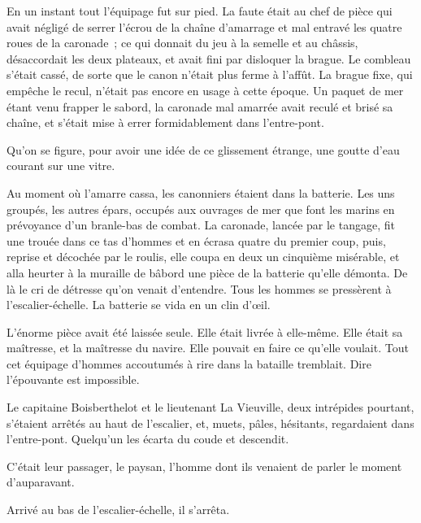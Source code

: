 \documentclass[french,twoside]{book} %
\begin{document}
En un instant tout l’équipage fut sur pied. La faute était au chef de pièce qui avait négligé de serrer l’écrou de la chaîne d’amarrage et mal entravé les quatre roues de la caronade ; ce qui donnait du jeu à la semelle et au châssis, désaccordait les deux plateaux, et avait fini par disloquer la brague. Le combleau s’était cassé, de sorte que le canon n’était plus ferme à l’affût. La brague fixe, qui empêche le recul, n’était pas encore en usage à cette époque. Un paquet de mer étant venu frapper le sabord, la caronade mal amarrée avait reculé et brisé sa chaîne, et s’était mise à errer formidablement dans l’entre-pont.\par
Qu’on se figure, pour avoir une idée de ce glissement étrange, une goutte d’eau courant sur une vitre.\par
Au moment où l’amarre cassa, les canonniers étaient dans la batterie. Les uns groupés, les autres épars, occupés aux ouvrages de mer que font les marins en prévoyance d’un branle-bas de combat. La caronade, lancée par le tangage, fit une trouée dans  ce tas d’hommes et en écrasa quatre du premier coup, puis, reprise et décochée par le roulis, elle coupa en deux un cinquième misérable, et alla heurter à la muraille de bâbord une pièce de la batterie qu’elle démonta. De là le cri de détresse qu’on venait d’entendre. Tous les hommes se pressèrent à l’escalier-échelle. La batterie se vida en un clin d’œil.\par
L’énorme pièce avait été laissée seule. Elle était livrée à elle-même. Elle était sa maîtresse, et la maîtresse du navire. Elle pouvait en faire ce qu’elle voulait. Tout cet équipage d’hommes accoutumés à rire dans la bataille tremblait. Dire l’épouvante est impossible.\par
Le capitaine Boisberthelot et le lieutenant La Vieuville, deux intrépides pourtant, s’étaient arrêtés au haut de l’escalier, et, muets, pâles, hésitants, regardaient dans l’entre-pont. Quelqu’un les écarta du coude et descendit.\par
C’était leur passager, le paysan, l’homme dont ils venaient de parler le moment d’auparavant.\par
Arrivé au bas de l’escalier-échelle, il s’arrêta.
\end{document}
